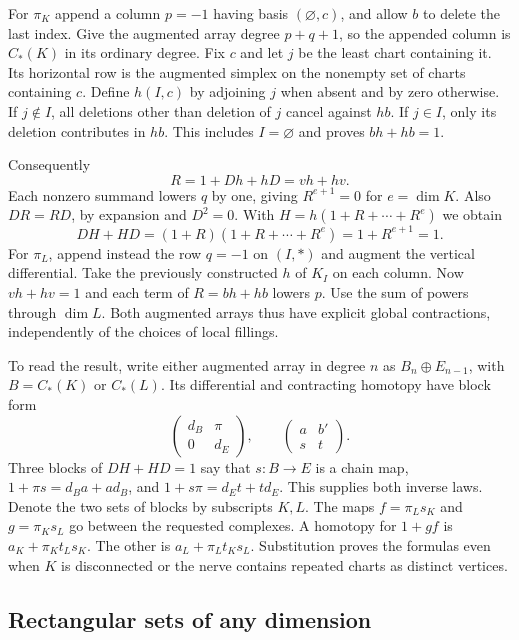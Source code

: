 For $\pi_K$ append a column $p=-1$ having basis $(\varnothing,c)$, and
allow $b$ to delete the last index. Give the augmented array degree $p+q+1$,
so the appended column is $C_*(K)$ in its ordinary degree. Fix $c$ and let
$j$ be the least chart containing it. Its horizontal row is the augmented
simplex on the nonempty set of charts containing $c$. Define $h(I,c)$ by
adjoining $j$ when absent and by zero otherwise. If $j\notin I$, all
deletions other than deletion of $j$ cancel against $hb$. If $j\in I$,
only its deletion contributes in $hb$. This includes $I=\varnothing$
and proves $bh+hb=1$.

Consequently
\[
 R=1+Dh+hD=vh+hv.
\]
Each nonzero summand lowers $q$ by one, giving $R^{e+1}=0$ for
$e=\dim K$. Also $DR=RD$, by expansion and $D^2=0$. With
$H=h(1+R+\cdots+R^e)$ we obtain
\[
 DH+HD=(1+R)(1+R+\cdots+R^e)=1+R^{e+1}=1.
\]
For $\pi_L$, append instead the row $q=-1$ on $(I,*)$ and augment the
vertical differential. Take the previously constructed $h$ of $K_I$ on each
column. Now $vh+hv=1$ and each term of $R=bh+hb$ lowers $p$. Use the sum of
powers through $\dim L$. Both augmented arrays thus have explicit global
contractions, independently of the choices of local fillings.

To read the result, write either augmented array in degree $n$ as
$B_n\oplus E_{n-1}$, with $B=C_*(K)$ or $C_*(L)$. Its differential and
contracting homotopy have block form
\[
 \begin{pmatrix}d_B&\pi\\0&d_E\end{pmatrix},
 \qquad
 \begin{pmatrix}a&b'\\s&t\end{pmatrix}.
\]
Three blocks of $DH+HD=1$ say that $s:B\to E$ is a chain map,
$1+\pi s=d_Ba+ad_B$, and $1+s\pi=d_Et+td_E$. This supplies both
inverse laws. Denote the two sets of blocks by subscripts $K,L$.
The maps $f=\pi_L s_K$ and $g=\pi_K s_L$ go between the requested
complexes. A homotopy for $1+gf$ is
$a_K+\pi_Kt_Ls_K$. The other is $a_L+\pi_Lt_Ks_L$.
Substitution proves the formulas even when $K$ is disconnected or the nerve
contains repeated charts as distinct vertices.

\subsection{Rectangular sets of any dimension}

